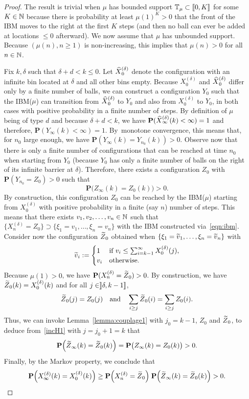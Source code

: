 \documentclass[AHL,Unicode,longabstracts,published]{cedram}
\newcommand{\bbN}{\mathbb{N}}
\newcommand{\T}{\mathbb{T}}
\renewcommand{\P}{\mathbf{P}}
\let\originalleft\left
\let\originalright\right
\renewcommand{\left}{\mathopen{}\mathclose\bgroup\originalleft}
\renewcommand{\right}{\aftergroup\egroup\originalright}
\let\oldin\in
\renewcommand{\in}{\mathchoice{\oldin}{\oldin}{\,\oldin\,}{\,\oldin\,}}
\let\oldtilde\tilde
\renewcommand*{\tilde}[1]{\mathchoice{\widetilde{#1}}{\widetilde{#1}}{\oldtilde{#1}}{\oldtilde{#1}}}
\let\oldhat\hat
\renewcommand*{\hat}[1]{\mathchoice{\widehat{#1}}{\widehat{#1}}{\oldhat{#1}}{\oldhat{#1}}}
\newcommand{\llbracket}{\mathopen{[\mkern -2.7mu[}}
\newcommand{\rrbracket}{\mathclose{]\mkern -2.7mu]}}
\newcommand{\llb}{\llbracket}
\newcommand{\rrb}{\rrbracket}
\begin{document}
\begin{proof}
The result is trivial when $\mu$ has bounded support $\T_\mu \subset \llb 0,K \rrb$ for some $K\in \bbN$ because there is probability at least $\mu(1)^K > 0$ that the front of the IBM moves to the right at the first $K$ steps (and then no ball can ever be added at locations $\leq 0$ afterward). We now assume that $\mu$ has unbounded support. Because $(\mu(n), n\geq 1)$ is non-increasing, this implies that $\mu(n) > 0$ for all $n\in \bbN$.

Fix $k,\delta$ such that $\delta + d < k \leq 0$. Let $\hat{X}_0^{(\delta)}$ denote the configuration with an infinite bin located at $\delta$ and all other bins empty. Because $X_0^{(\delta)}$ and $\hat{X}_0^{(\delta)}$ differ only by a finite number of balls, we can construct a configuration $Y_0$ such that the IBM($\mu$) can transition from $\hat{X}_0^{(\delta)}$ to $Y_0$ and also from $X_0^{(\delta)}$ to $Y_0$, in both cases with positive probability in a finite number of steps. By definition of $\mu$ being of type $d$ and because $\delta+d < k$, we have $\P(\hat{X}_\infty^{(\delta)}(k) < \infty) = 1$ and therefore, $\P(Y_\infty(k) < \infty) = 1$. By~monotone convergence, this means that, for $n_0$ large enough, we have $\P(Y_\infty(k) = Y_{n_0}(k)) > 0$. Observe now that there is only a finite number of configurations that can be reached at time $n_0$ when starting from $Y_0$ (because $Y_0$ has only a finite number of balls on the right of its infinite barrier at $\delta$). Therefore, there exists a configuration $Z_0$ with $\P(Y_{n_0} = Z_0) > 0$ such that
\[
\P\bigl(Z_{\infty}(k) = Z_0(k)\bigr) > 0.
\]
By construction, this configuration $Z_0$ can be reached by the IBM($\mu$) starting from $X^{(\delta)}_0$ with positive probability in a finite (say $n$) number of steps. This means that there exists $v_1,v_2,\ldots, v_n \in \bbN$ such that $\{ X^{(\delta)}_n = Z_0 \} \supset \{\xi_1 = v_1, \ldots, \xi_n = v_n \}$ with the IBM constructed via~\eqref{eqn:ibm}. Consider now the configuration $\tilde{Z}_0$ obtained when $\{\xi_1 = \tilde{v}_1, \ldots, \xi_n = \tilde{v}_n \}$ with
\[
\tilde{v}_i
:=
\begin{cases}
1 & \text{if }v_i \leq \sum_{i=k-1}^\infty X^{(\delta)}_{0}(j),\\
v_i & \text{otherwise.}
\end{cases}
\]
Because $\mu(1) > 0$, we have $\P(X^{(\delta)}_n = \tilde{Z}_0) > 0$. By construction, we have $\tilde{Z}_0(k) = X^{(\delta)}_0(k)$ and for all $j \in \rrb\delta, k-1 \rrb$,
\[
\tilde{Z}_0(j) = Z_0(j) \quad\text{and}\quad \sum_{i\geq j} \tilde{Z}_0(i) = \sum_{i\geq j} Z_0(i).
\]
Thus, we can invoke Lemma~\ref{lemma:couplage1} with $j_0=k-1$, $Z_0$ and $\tilde{Z}_0$, to deduce from~\eqref{incH1} with $j = j_0 + 1 = k$ that
\[
\P\left(\tilde{Z}_\infty(k) = \tilde{Z}_0(k)\right) = \P\bigl(Z_\infty(k) = Z_0(k)\bigr) > 0.
\]
Finally, by the Markov property, we conclude that
\[
\P\left(X^{(\delta)}_\infty(k) = X^{(\delta)}_{0}(k)\right) \geq \P\left(X^{(\delta)}_{n} = \tilde{Z}_0\right)\; \P\left(\tilde{Z}_\infty(k) = \tilde{Z}_0(k)\right)  > 0.
\]
\end{proof}
\end{document}
